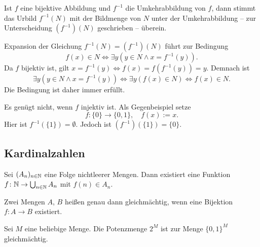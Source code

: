 \begin{Satz}
Ist $f$ eine bijektive Abbildung und $f^{-1}$ die Umkehrabbildung
von $f$, dann stimmt das Urbild $f^{-1}(N)$ mit der Bildmenge
von $N$ unter der Umkehrabbildung -- zur Unterscheidung $(f^{-1})(N)$
geschrieben -- überein.
\end{Satz}
\begin{Beweis}
Expansion der Gleichung $f^{-1}(N)=(f^{-1})(N)$ führt zur Bedingung
\[f(x)\in N\iff \exists y(y\in N\land x=f^{-1}(y)).\]
Da $f$ bijektiv ist, gilt $x=f^{-1}(y)\iff f(x)=f(f^{-1}(y))=y$.
Demnach ist
\[\exists y(y\in N\land x=f^{-1}(y))\iff \exists y(f(x)\in N)\iff f(x)\in N.\]
Die Bedingung ist daher immer erfüllt.\;\qedsymbol
\end{Beweis}
Es genügt nicht, wenn $f$ injektiv ist. Als Gegenbeispiel setze
\[f\colon\{0\}\to\{0,1\},\quad f(x):=x.\]
Hier ist $f^{-1}(\{1\})=\emptyset$. Jedoch ist
$(f^{-1})(\{1\})=\{0\}$.

\newpage
\subsection{Kardinalzahlen}
\begin{Satz}\label{acc}%
Sei $(A_n)_{n\in\mathbb N}$ eine Folge nichtleerer Mengen.
Dann existiert eine Funktion $f\colon\mathbb N\to\bigcup_{n\in\mathbb N} A_n$
mit $f(n)\in A_n$.
\end{Satz}

\begin{Definition}%
\label{def:equipotent}
Zwei Mengen $A$, $B$ heißen genau dann gleichmächtig, wenn
eine Bijektion $f\colon A\to B$ existiert.
\end{Definition}

\begin{Satz}
Sei $M$ eine beliebige Menge. Die Potenzmenge $2^M$ ist zur
Menge $\{0,1\}^M$ gleichmächtig.
\end{Satz}

